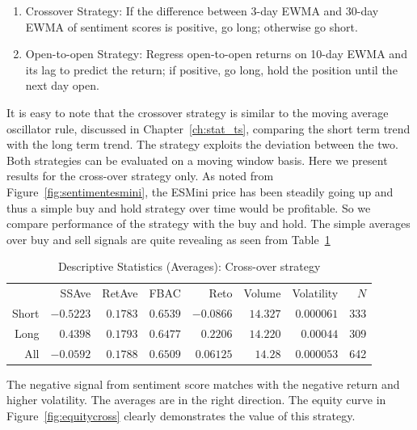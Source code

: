\begin{enumerate}[1.]
\item Crossover Strategy: If the difference between 3-day EWMA and 30-day EWMA of sentiment scores is positive, go long; otherwise go short. 
\item Open-to-open Strategy: Regress open-to-open returns on 10-day EWMA and its lag to predict the return; if positive, go long, hold the position until the next day open. 
\end{enumerate}


It is easy to note that the crossover strategy is similar to the moving average oscillator rule, discussed in Chapter~\ref{ch:stat_ts}, comparing the short term trend with the long term trend. The strategy exploits the deviation between the two. Both strategies can be evaluated on a moving window basis. Here we present results for the cross-over strategy only. As noted from Figure~\ref{fig:sentimentesmini}, the ESMini price has been steadily going up and thus a simple buy and hold strategy over time would be profitable. So we compare performance of the strategy with the buy and hold. The simple averages over buy and sell signals are quite revealing as seen from Table~\ref{tab:descstatcross}

        \begin{table}[!ht]
        \centering
        \caption{Descriptive Statistics (Averages): Cross-over strategy \label{tab:descstatcross}}
        \begin{tabular}{rrrrrrrr}
         & SSAve & RetAve & FBAC & Reto & Volume & Volatility & $N$ \\
        Short  & $-0.5223$ & $0.1783$ & $0.6539$ & $-0.0866$ & $14.327$ & $0.000061$ & 333 \\
         Long & $0.4398$ & $0.1793$ & $0.6477$ & $0.2206$ & $14.220$ & $0.00044$ & 309 \\
         All & $-0.0592$ & $0.1788$ & $0.6509$ & $0.06125$ & $14.28$ & $0.000053$ & 642
        \end{tabular} 
        \end{table}

The negative signal from sentiment score matches with the negative return and higher volatility. The averages are in the right direction. The equity curve in Figure~\ref{fig:equitycross} clearly demonstrates the value of this strategy. \twomedskip

